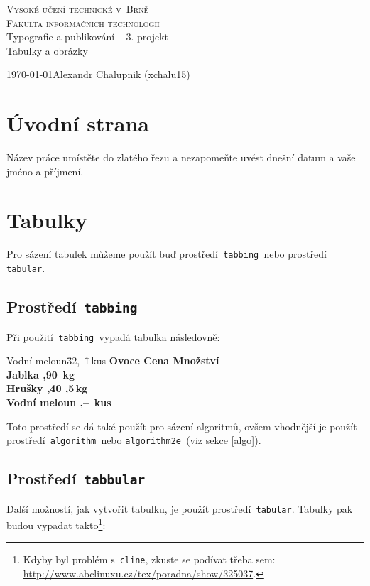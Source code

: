 \documentclass[11pt, a4paper]{article}
\def \noteA {Kdyby byl problém s~\texttt{cline}, zkuste se podívat třeba sem: \urlstyle{rm}\url{http://www.abclinuxu.cz/tex/poradna/show/325037}.}
\begin{document}
\begin{titlepage}
    \begin{center}
        \Huge{\textsc{Vysoké učení technické v~Brně}}\\
        \huge{\textsc{Fakulta informačních technologií}}\\
        \LARGE{Typografie a publikování -- 3. projekt}\\
        \Huge{Tabulky a obrázky}\\
    \end{center}
    {\Large \today \hfill Alexandr Chalupnik (xchalu15)}
\end{titlepage}

\section{Úvodní strana}
Název práce umístěte do zlatého řezu a nezapomeňte uvést dnešní datum a vaše jméno a příjmení.
\section{Tabulky}
Pro sázení tabulek můžeme použít buď prostředí\verb| tabbing |nebo prostředí\verb| tabular|.
\subsection{Prostředí\texttt{ tabbing}}
Při použití\verb| tabbing |vypadá tabulka následovně:

\begin{tabbing}
Vodní meloun\qquad \= 32,--\qquad \= 1\,kus \kill
\bfseries Ovoce \>
\bfseries Cena \>
\bfseries Množství \\
Jablka ,90 \,kg \\
Hrušky ,40 ,5\,kg \\
Vodní meloun ,-- \,kus \\
\end{tabbing}

\noindent Toto prostředí se dá také použít pro sázení algoritmů, ovšem vhodnější je použít prostředí\verb| algorithm |nebo \verb|algorithm2e |(viz sekce \ref{algo}).


\subsection{Prostředí\texttt{ tabbular}}
Další možností, jak vytvořit tabulku, je použít prostředí\verb| tabular|. Tabulky pak budou vypadat takto\footnote{\noteA}:
\end{document}
